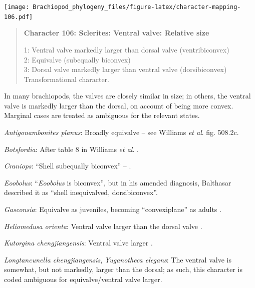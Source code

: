 \documentclass[openany]{book}
\begin{document}
\texttt{[image: Brachiopod\_phylogeny\_files/figure-latex/character-mapping-106.pdf]}

\begin{quote}
\textbf{Character 106: Sclerites: Ventral valve: Relative size}

1: Ventral valve markedly larger than dorsal valve (ventribiconvex)\\
2: Equivalve (subequally biconvex)\\
3: Dorsal valve markedly larger than ventral valve (dorsibiconvex)\\
Transformational character.
\end{quote}

In many brachiopods, the valves are closely similar in size; in others,
the ventral valve is markedly larger than the dorsal, on account of
being more convex. Marginal cases are treated as ambiguous for the
relevant states.

\hypertarget{Antigonambonites_planus-coding-106}{}
\emph{Antigonambonites planus}: Broadly equivalve -- see Williams
\emph{et al}. \citeyearpar{Williams2000LinguliformeaCraniiformea} fig.
508.2c.

\hypertarget{Botsfordia-coding-106}{}
\emph{Botsfordia}: After table 8 in Williams \emph{et al}.
\citeyearpar{Williams2000LinguliformeaCraniiformea}.

\hypertarget{Craniops-coding-106}{}
\emph{Craniops}: ``Shell subequally biconvex'' --
\citet{Williams2000LinguliformeaCraniiformea}.

\hypertarget{Eoobolus-coding-106}{}
\emph{Eoobolus}: ``\emph{Eoobolus} is biconvex'', but in his amended
diagnosis, Balthasar \citeyearpar{Balthasar2009Thebrachiopod} described
it as ``shell inequivalved, dorsibiconvex''.

\hypertarget{Gasconsia-coding-106}{}
\emph{Gasconsia}: Equivalve as juveniles, becoming ``convexiplane''
\citep[p.~187]{Williams2000LinguliformeaCraniiformea} as adults
\citep{Hanken1985Thetaxonomy}.

\hypertarget{Heliomedusa_orienta-coding-106}{}
\emph{Heliomedusa orienta}: Ventral valve larger than the dorsal valve
\citep[p.~659]{Zhang2009Architectureand}.

\hypertarget{Kutorgina_chengjiangensis-coding-106}{}
\emph{Kutorgina chengjiangensis}: Ventral valve larger \citep[see][fig.
125.]{Williams2000LinguliformeaCraniiformea}.

\hypertarget{Longtancunella_chengjiangensis-coding-106}{}
\emph{Longtancunella chengjiangensis}, \emph{Yuganotheca elegans}: The
ventral valve is somewhat, but not markedly, larger than the dorsal; as
such, this character is coded ambiguous for equivalve/ventral valve
larger.
\end{document}
